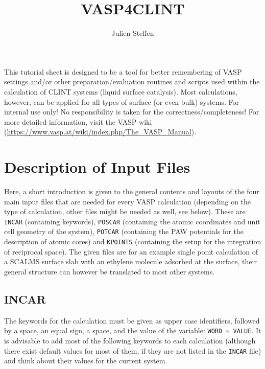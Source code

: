 \documentclass[a4paper,11pt]{article}
\title{VASP4CLINT}
\author{Julien Steffen}
\begin{document}
\maketitle

This tutorial sheet is designed to be a tool for better remembering of VASP settings and/or
other preparation/evaluation routines and scripts used within the calculation
of CLINT systems (liquid surface catalysis). Most calculations, however, can be
applied for all types of surface (or even bulk) systems.
For internal use only! No responsibility is taken for the
correctness/completeness! For more detailed information, visit the VASP wiki (\url{https://www.vasp.at/wiki/index.php/The_VASP_Manual}).

\tableofcontents

\section{Description of Input Files}

Here, a short introduction is given to the general contents and layouts of the 
four main input files that are needed for every VASP calculation (depending 
on the type of calculation, other files might be needed as well, see below).
These are \texttt{INCAR} (containing keywords), \texttt{POSCAR} (containing the 
atomic coordinates and unit cell geometry of the system), \texttt{POTCAR} (containing 
the PAW potentials for the description of atomic cores) and \texttt{KPOINTS} (containing 
the setup for the integration of reciprocal space).
The given files are for an example single point calculation of a SCALMS surface slab
with an ethylene molecule adsorbed at the surface, their general structure can however 
be translated to most other systems.

\subsection{INCAR}

The keywords for the calculation must be given as upper case identifiers, followed 
by a space, an equal sign, a space, and the value of the variable: \texttt{WORD = VALUE}.
It is advisable to add most of the following keywords to each calculation (although there 
exist default values for most of them, if they are not listed in the \texttt{INCAR} file)
and think about their values for the current system.
\end{document}
